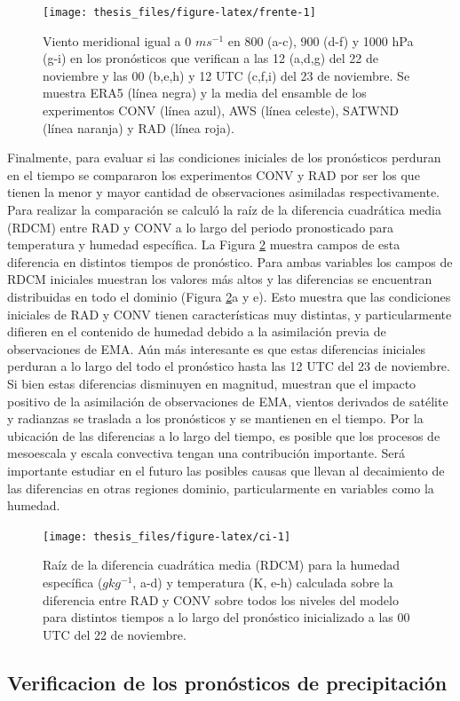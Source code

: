 \documentclass[12pt,oneside,a4paper]{reedthesis}
\begin{document}
\begin{figure}
\texttt{[image: thesis\_files/figure-latex/frente-1]} \caption{Viento meridional igual a 0 \(ms^{-1}\) en 800 (a-c), 900 (d-f) y 1000 hPa (g-i) en los pronósticos que verifican a las 12 (a,d,g) del 22 de noviembre y las 00 (b,e,h) y 12 UTC (c,f,i) del 23 de noviembre. Se muestra ERA5 (línea negra) y la media del ensamble de los experimentos CONV (línea azul), AWS (línea celeste), SATWND (línea naranja) y RAD (línea roja).}\label{fig:frente}
\end{figure}
Finalmente, para evaluar si las condiciones iniciales de los pronósticos perduran en el tiempo se compararon los experimentos CONV y RAD por ser los que tienen la menor y mayor cantidad de observaciones asimiladas respectivamente. Para realizar la comparación se calculó la raíz de la diferencia cuadrática media (RDCM) entre RAD y CONV a lo largo del periodo pronosticado para temperatura y humedad específica. La Figura \ref{fig:ci} muestra campos de esta diferencia en distintos tiempos de pronóstico. Para ambas variables los campos de RDCM iniciales muestran los valores más altos y las diferencias se encuentran distribuidas en todo el dominio (Figura \ref{fig:ci}a y e). Esto muestra que las condiciones iniciales de RAD y CONV tienen características muy distintas, y particularmente difieren en el contenido de humedad debido a la asimilación previa de observaciones de EMA. Aún más interesante es que estas diferencias iniciales perduran a lo largo del todo el pronóstico hasta las 12 UTC del 23 de noviembre. Si bien estas diferencias disminuyen en magnitud, muestran que el impacto positivo de la asimilación de observaciones de EMA, vientos derivados de satélite y radianzas se traslada a los pronósticos y se mantienen en el tiempo. Por la ubicación de las diferencias a lo largo del tiempo, es posible que los procesos de mesoescala y escala convectiva tengan una contribución importante. Será importante estudiar en el futuro las posibles causas que llevan al decaimiento de las diferencias en otras regiones dominio, particularmente en variables como la humedad.


\begin{figure}

\texttt{[image: thesis\_files/figure-latex/ci-1]} \hfill{}

\caption{Raíz de la diferencia cuadrática media (RDCM) para la humedad específica (\(gkg^{-1}\), a-d) y temperatura (K, e-h) calculada sobre la diferencia entre RAD y CONV sobre todos los niveles del modelo para distintos tiempos a lo largo del pronóstico inicializado a las 00 UTC del 22 de noviembre.}\label{fig:ci}
\end{figure}
\hypertarget{verificacion-de-los-pronuxf3sticos-de-precipitaciuxf3n}{%
\subsection{Verificacion de los pronósticos de precipitación}\label{verificacion-de-los-pronuxf3sticos-de-precipitaciuxf3n}}
\end{document}
